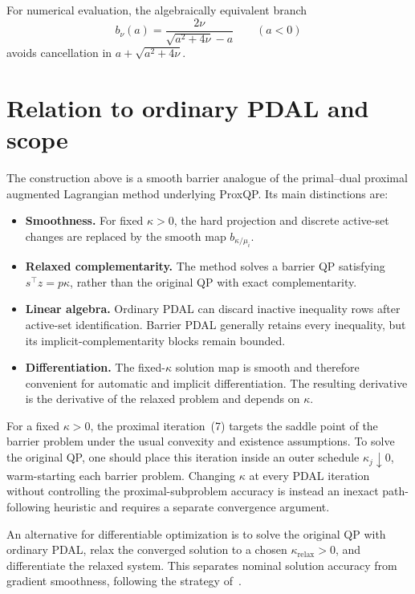 \documentclass[10pt]{article}
\begin{document}
For numerical evaluation, the algebraically equivalent branch
\begin{equation}
b_\nu(a)=\frac{2\nu}{\sqrt{a^2+4\nu}-a}
\qquad (a<0)
\end{equation}
avoids cancellation in $a+\sqrt{a^2+4\nu}$.

\section{Relation to ordinary PDAL and scope}

The construction above is a smooth barrier analogue of the primal--dual proximal augmented Lagrangian method underlying ProxQP. Its main distinctions are:
\begin{itemize}
\item \textbf{Smoothness.} For fixed $\kappa>0$, the hard projection and discrete active-set changes are replaced by the smooth map $b_{\kappa/\mu_i}$.
\item \textbf{Relaxed complementarity.} The method solves a barrier QP satisfying $s^\top z=p\kappa$, rather than the original QP with exact complementarity.
\item \textbf{Linear algebra.} Ordinary PDAL can discard inactive inequality rows after active-set identification. Barrier PDAL generally retains every inequality, but its implicit-complementarity blocks remain bounded.
\item \textbf{Differentiation.} The fixed-$\kappa$ solution map is smooth and therefore convenient for automatic and implicit differentiation. The resulting derivative is the derivative of the relaxed problem and depends on $\kappa$.
\end{itemize}

For a fixed $\kappa>0$, the proximal iteration~(7) targets the saddle point of the barrier problem under the usual convexity and existence assumptions. To solve the original QP, one should place this iteration inside an outer schedule $\kappa_j\downarrow0$, warm-starting each barrier problem. Changing $\kappa$ at every PDAL iteration without controlling the proximal-subproblem accuracy is instead an inexact path-following heuristic and requires a separate convergence argument.

An alternative for differentiable optimization is to solve the original QP with ordinary PDAL, relax the converged solution to a chosen $\kappa_{\mathrm{relax}}>0$, and differentiate the relaxed system. This separates nominal solution accuracy from gradient smoothness, following the strategy of~\cite{arrizabalaga2026single}.
\end{document}
